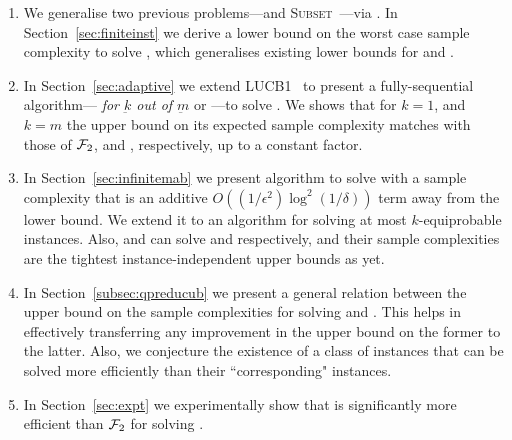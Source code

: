\begin{enumerate}
    \item We generalise two previous problems---\QF and \textsc{Subset}~\citep{bib:arcsk2017}---via \QFK. In Section~\ref{sec:finiteinst} we derive a lower bound on the worst case sample 
    complexity to solve \QFK, which generalises existing lower bounds for \QF and \SUBSET.
    
    \item  In Section~\ref{sec:adaptive} we extend \textsc{LUCB1}~\citep{bib:lucb} 
    to present a fully-sequential algorithm---\emph{ for $\underbar{k}$ out of $\underbar{m}$}
    or \GLUCB---to solve \QFK. 
    We shows that for $k=1$, and $k=m$ the upper bound on its expected sample complexity
    matches with those of $\mathcal{F}_2$, and \LUCB, respectively, up to a constant factor.
    
    \item  In Section~\ref{sec:infinitemab} we present algorithm \PPP to solve 
    \QP with a sample complexity that is an additive $O((1/\epsilon^{2})\log^2(1/\delta))$ term away from the lower bound.
    We extend it to an algorithm \KQP for solving at most $k$-equiprobable \QPK instances. Also, \PPP and \KQP can
    solve \QF and \QFK respectively, and their sample complexities are the tightest 
    instance-independent upper bounds as yet.

    \item In Section~\ref{subsec:qpreducub} we present a general relation between the 
    upper bound on the sample complexities for solving \QF and \QP. This helps in effectively transferring
    any improvement in the upper bound on the former to the latter. Also, we conjecture
    the existence of a class of \QF instances that can be solved more efficiently than their 
    ``corresponding" \QP instances.

    \item In Section~\ref{sec:expt} we experimentally show that \GLUCB is
    significantly more efficient than $\mathcal{F}_2$ for solving \QF.
    
\end{enumerate}

